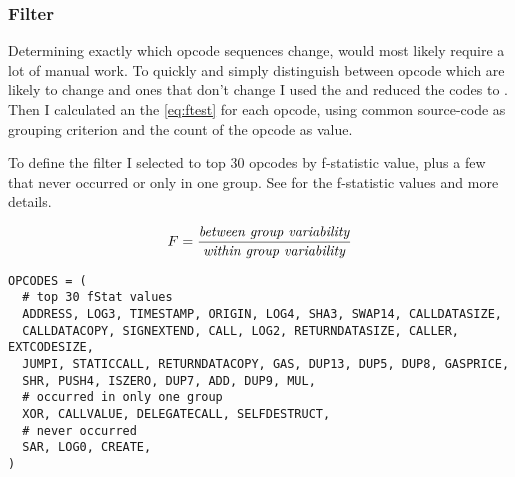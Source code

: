\documentclass[../main.tex]{subfiles}
\begin{document}
\subsubsection{ Filter \label{sec:fStat}}
Determining exactly which opcode sequences change, would most likely require a lot of manual work.
To quickly and simply distinguish between opcode which are likely to change and ones that don't change I used the \n{\solcts}  and reduced the codes to  . Then I calculated an the  \eqref{eq:ftest} for each opcode, using common source-code as grouping criterion and the count of the opcode as value.

To define the  filter I selected to top 30 opcodes by f-statistic value, plus a few that never occurred or only in one group. See  for the f-statistic values and more details.

\begin{equation}
  F = \dfrac{\mbox{\textit{between group variability}}}{\mbox{\textit{within group variability}}}
  \label{eq:ftest}
\end{equation}

\begin{lstlisting}[style=pymd]
OPCODES = (
  # top 30 fStat values
  ADDRESS, LOG3, TIMESTAMP, ORIGIN, LOG4, SHA3, SWAP14, CALLDATASIZE,
  CALLDATACOPY, SIGNEXTEND, CALL, LOG2, RETURNDATASIZE, CALLER, EXTCODESIZE,
  JUMPI, STATICCALL, RETURNDATACOPY, GAS, DUP13, DUP5, DUP8, GASPRICE,
  SHR, PUSH4, ISZERO, DUP7, ADD, DUP9, MUL,
  # occurred in only one group
  XOR, CALLVALUE, DELEGATECALL, SELFDESTRUCT,
  # never occurred
  SAR, LOG0, CREATE,
)
\end{lstlisting}
\end{document}

